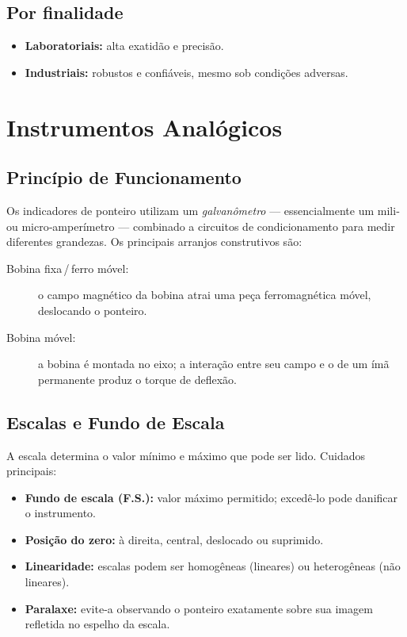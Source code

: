\subsection{Por finalidade}
\begin{itemize}
  \item \textbf{Laboratoriais:} alta exatidão e precisão.
  \item \textbf{Industriais:} robustos e confiáveis, mesmo sob condições adversas.
\end{itemize}
\section{Instrumentos Analógicos}

\subsection{Princípio de Funcionamento}
Os indicadores de ponteiro utilizam um \emph{galvanômetro} — essencialmente um mili‑ ou micro‑amperímetro — combinado a circuitos de condicionamento para medir diferentes grandezas. Os principais arranjos construtivos são:

\begin{description}
  \item[Bobina fixa\,/\,ferro móvel:] o campo magnético da bobina atrai uma peça ferromagnética móvel, deslocando o ponteiro.
  \item[Bobina móvel:] a bobina é montada no eixo; a interação entre seu campo e o de um ímã permanente produz o torque de deflexão.
\end{description}

\subsection{Escalas e Fundo de Escala}
A escala determina o valor mínimo e máximo que pode ser lido. Cuidados principais:

\begin{itemize}
  \item \textbf{Fundo de escala (F.S.):} valor máximo permitido; excedê‑lo pode danificar o instrumento.
  \item \textbf{Posição do zero:} à direita, central, deslocado ou suprimido.
  \item \textbf{Linearidade:} escalas podem ser homogêneas (lineares) ou heterogêneas (não lineares).
  \item \textbf{Paralaxe:} evite‑a observando o ponteiro exatamente sobre sua imagem refletida no espelho da escala.
\end{itemize}

